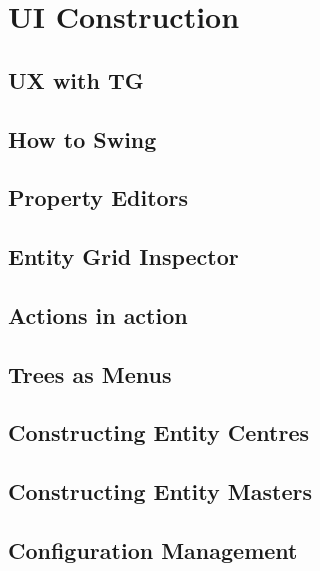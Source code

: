 \chapter{UI Construction}\label{ch:03}

\section{UX with TG}

\section{How to Swing}

\section{Property Editors}

\section{Entity Grid Inspector}

\section{Actions in action}

\section{Trees as Menus}

\section{Constructing Entity Centres}

\section{Constructing Entity Masters}

\section{Configuration Management}


